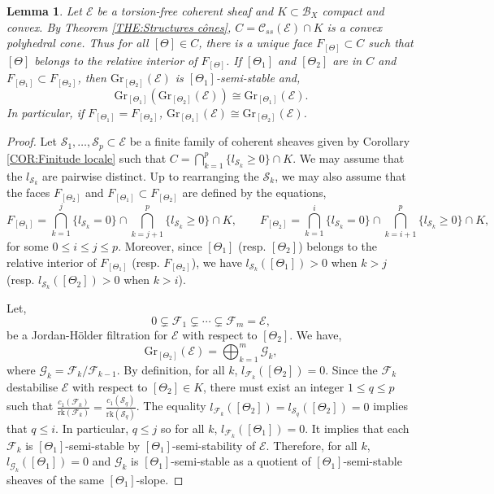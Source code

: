 \documentclass{article}
\newtheorem{lemma}[theorem]{Lemma}
\theoremstyle{remark}
\theoremstyle{definition}
\newcommand{\rk}{\mathrm{rk}}
\newcommand{\E}{\mathcal{E}}
\newcommand{\F}{\mathcal{F}}
\newcommand{\G}{\mathcal{G}}
\newcommand{\Gr}{\mathrm{Gr}}
\newcommand{\mC}{\mathcal{C}}
\renewcommand{\leq}{\leqslant}
\renewcommand{\geq}{\geqslant}
\begin{document}
\begin{lemma}\label{LEM:Gr(Gr)}
    Let $\E$ be a torsion-free coherent sheaf and $K \subset \mathcal{B}_X$ compact and convex. By Theorem \ref{THE:Structures cônes}, $C = \mC_{ss}(\E) \cap K$ is a convex polyhedral cone. Thus for all $[\Theta] \in C$, there is a unique face $F_{[\Theta]} \subset C$ such that $[\Theta]$ belongs to the relative interior of $F_{[\Theta]}$. If $[\Theta_1]$ and $[\Theta_2]$ are in $C$ and $F_{[\Theta_1]} \subset F_{[\Theta_2]}$, then $\Gr_{[\Theta_2]}(\E)$ is $[\Theta_1]$-semi-stable and,
    $$
    \Gr_{[\Theta_1]}(\Gr_{[\Theta_2]}(\E)) \cong \Gr_{[\Theta_1]}(\E).
    $$
    In particular, if $F_{[\Theta_1]} = F_{[\Theta_2]}$, $\Gr_{[\Theta_1]}(\E) \cong \Gr_{[\Theta_2]}(\E)$.
\end{lemma}
\begin{proof}
Let $\mathcal{S}_1,\ldots,\mathcal{S}_p \subset \E$ be a finite family of coherent sheaves given by Corollary \ref{COR:Finitude locale} such that $C = \bigcap_{k = 1}^p \{l_{\mathcal{S}_k} \geq 0\} \cap K$. We may assume that the $l_{\mathcal{S}_k}$ are pairwise distinct. Up to rearranging the $\mathcal{S}_k$, we may also assume that the faces $F_{[\Theta_2]}$ and $F_{[\Theta_1]} \subset F_{[\Theta_2]}$ are defined by the equations,
$$
F_{[\Theta_1]} = \bigcap_{k = 1}^j \{l_{\mathcal{S}_k} = 0\} \cap \bigcap_{k = j + 1}^p \{l_{\mathcal{S}_k} \geq 0\} \cap K, \qquad F_{[\Theta_2]} = \bigcap_{k = 1}^i \{l_{\mathcal{S}_k} = 0\} \cap \bigcap_{k = i + 1}^p \{l_{\mathcal{S}_k} \geq 0\} \cap K,
$$
for some $0 \leq i \leq j \leq p$. Moreover, since $[\Theta_1]$ (resp. $[\Theta_2]$) belongs to the relative interior of $F_{[\Theta_1]}$ (resp. $F_{[\Theta_2]}$), we have $l_{\mathcal{S}_k}([\Theta_1]) > 0$ when $k > j$ (resp. $l_{\mathcal{S}_k}([\Theta_2]) > 0$ when $k > i$).

Let,
$$
0 \subsetneq \F_1 \subsetneq \cdots \subsetneq \F_m = \E,
$$
be a Jordan-Hölder filtration for $\E$ with respect to $[\Theta_2]$. We have,
\begin{equation}\label{EQ:Expression gradué}
    \Gr_{[\Theta_2]}(\E) = \bigoplus_{k = 1}^m \G_k,
\end{equation}
where $\G_k = \F_k/\F_{k - 1}$. By definition, for all $k$, $l_{\F_k}([\Theta_2]) = 0$. Since the $\F_k$ destabilise $\E$ with respect to $[\Theta_2] \in K$, there must exist an integer $1 \leq q \leq p$ such that $\frac{c_1(\F_k)}{\rk(\F_k)} = \frac{c_1(\mathcal{S}_q)}{\rk(\mathcal{S}_q)}$. The equality $l_{\F_k}([\Theta_2]) = l_{\mathcal{S}_q}([\Theta_2]) = 0$ implies that $q \leq i$. In particular, $q \leq j$ so for all $k$, $l_{\F_k}([\Theta_1]) = 0$. It implies that each $\F_k$ is $[\Theta_1]$-semi-stable by $[\Theta_1]$-semi-stability of $\E$. Therefore, for all $k$, $l_{\G_k}([\Theta_1]) = 0$ and $\G_k$ is $[\Theta_1]$-semi-stable as a quotient of $[\Theta_1]$-semi-stable sheaves of the same $[\Theta_1]$-slope.


\end{proof}
\end{document}
